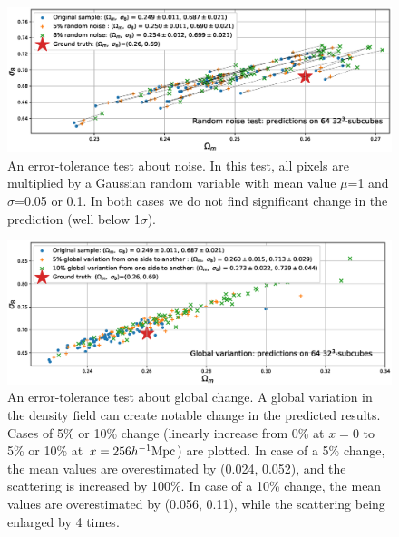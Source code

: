 \documentclass[twocolumn]{aastex61}
\begin{document}
\begin{figure}
   \centering
    \includegraphics[width=16cm]{test_noise.eps}
   \caption{\label{test_noise}
   An error-tolerance test about noise.
   In this test, all pixels are multiplied by a Gaussian random variable with 
   mean value $\mu$=1 and $\sigma$=0.05 or 0.1.
   In both cases we do not find significant change in the prediction (well below 1$\sigma$).
   }
\end{figure}

\begin{figure}
   \centering
    \includegraphics[width=16cm]{test_globalchange.eps}
   \caption{\label{test_globalchange}
   An error-tolerance test about global change.
   A global variation in the density field can create notable change in the predicted results.
   Cases of 5\% or 10\% change (linearly increase from 0\% at $x=0$ to 5\% or 10\% at $x=256 {h^{-1}\rm  Mpc}$) are plotted.
   In case of a 5\% change, the mean values are overestimated by (0.024, 0.052),
    and the scattering is increased by 100\%.
   In case of a 10\% change, the mean values are overestimated by (0.056, 0.11),
   while the scattering being enlarged by 4 times.
   }
\end{figure}
\end{document}
